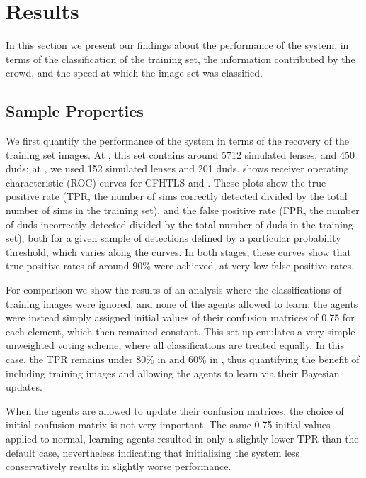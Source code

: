 \documentclass[useAMS,usenatbib,a4paper]{mn2e}
\begin{document}

\section{Results}
\label{sec:results}

In this section we present our findings about the performance of the \SW system,
in terms of the classification of the training set, the  information contributed
by the crowd, and the speed at which the image set was classified.


\subsection{Sample Properties}
\label{sec:results:sample}

We first quantify the performance of the \SW system in terms of the recovery of
the training set images. At \StageOne, this set contains around 5712 simulated
lenses, and 450 duds; at \StageTwo, we used 152 simulated lenses and 201 duds.
 shows receiver operating characteristic (ROC)
curves for CFHTLS \StageOne and \StageTwo. These plots show the true positive
rate (TPR, the number of sims correctly detected divided by the total number of
sims in the training set), and the false positive rate (FPR, the number of duds
incorrectly detected  divided by the total number of duds in the training set), both
for a given sample of detections defined by a particular probability threshold,
which varies along the curves.  In both stages, these curves show that true
positive rates of  around 90\% were achieved, at very low false positive rates.

For comparison we show the results of an analysis where the classifications of
training images were ignored, and none of the agents allowed to learn: the
agents were instead simply assigned initial values of their confusion matrices
of 0.75 for each element, which then remained constant. This set-up emulates a
very simple unweighted voting scheme, where all classifications are treated
equally.  In this case, the TPR remains under 80\% in \StageOne and 60\% in
\StageTwo, thus quantifying  the benefit of including training images and
allowing the agents to learn via their Bayesian updates.

When the agents are allowed to update their confusion matrices, the choice of
initial confusion matrix is not very important. The same 0.75 initial values
applied to normal, learning agents resulted in only a slightly lower TPR than
the default case, nevertheless indicating that initializing the system less
conservatively results in slightly worse performance.
\end{document}
